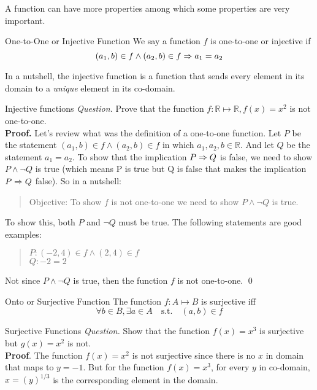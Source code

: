 A function can have more properties among which some properties are very important.

\begin{defbox}{One-to-One or Injective Function}
	We say a function $f$ is one-to-one or injective if 
	\[ (a_1, b) \in f \wedge (a_2, b) \in f \Rightarrow a_1=a_2 \]
\end{defbox}

In a nutshell, the injective function is a function that sends every element in its domain to a \textit{unique} element in its co-domain.

\begin{example}{Injective functions}
	\textit{Question.} Prove that the function $f: \mathbb{R} \mapsto \mathbb{R}, f(x) = x^2$ is not one-to-one. \\
	
	\textbf{Proof.} Let's review what was the definition of a one-to-one function. Let $P$ be the statement $(a_1, b) \in f \wedge (a_2, b) \in f$ in which $a_1, a_2, b \in \mathbb{R}$. And let $Q$ be the statement $a_1 = a_2$. To show that the implication $P \Rightarrow Q$ is false, we need to show $P \wedge \neg Q$ is true (which means P is true but Q is false that makes the implication $P \Rightarrow Q$ false). So in a nutshell:
	\begin{quote}
		Objective: To show $f$ is not one-to-one we need to show $P \wedge \neg Q$ is true. 
	\end{quote}
	
	To show this, both $P$ and $\neg Q$ must be true. The following statements are good examples:
	\begin{quote}
		$P: (-2,4) \in f \wedge (2,4) \in f$ \\
		$Q: -2=2$ 
	\end{quote}
	
	Not since $P \wedge \neg Q$ is true, then the function $f$ is not one-to-one. \qed
\end{example}

\begin{defbox}{Onto or Surjective Function}
	The function $f: A \mapsto B$ is surjective iff
	\[ \forall b \in B, \exists a \in A \quad \text{s.t.} \quad (a,b) \in f  \] 
\end{defbox}

\begin{example}{Surjective Functions}
	\textit{Question.} Show that the function $f(x) = x^3$ is surjective but $g(x)=x^2$ is not.  \\
	
	\textbf{Proof}. The function $f(x) = x^2$ is not surjective since there is no $x$ in domain that maps to $y=-1$. But for the function $f(x)=x^3$, for every $y$ in co-domain, $x=(y)^{1/3}$ is the corresponding element in the domain. 
\end{example}



